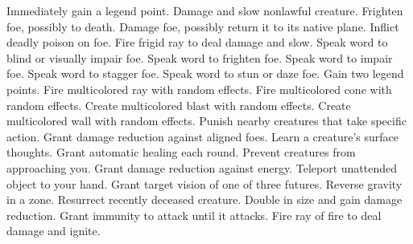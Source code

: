     {Immediately gain a legend point.}
    {Damage and slow nonlawful creature.}
    {Frighten foe, possibly to death.}
    {Damage foe, possibly return it to its native plane.}
    {Inflict deadly poison on foe.}
    {Fire frigid ray to deal damage and slow.}
    {Speak word to blind or visually impair foe.}
    {Speak word to frighten foe.}
    {Speak word to impair foe.}
    {Speak word to stagger foe.}
    {Speak word to stun or daze foe.}
    {Gain two legend points.}
    {Fire multicolored ray with random effects.}
    {Fire multicolored cone with random effects.}
    {Create multicolored blast with random effects.}
    {Create multicolored wall with random effects.}
    {Punish nearby creatures that take specific action.}
    {Grant damage reduction against aligned foes.}
    {Learn a creature's surface thoughts.}
    {Grant automatic healing each round.}
    {Prevent creatures from approaching you.}
    {Grant damage reduction against energy.}
    {Teleport unattended object to your hand.}
    {Grant target vision of one of three futures.}
    {Reverse gravity in a zone.}
    {Resurrect recently deceased creature.}
    {Double in size and gain damage reduction.}
    {Grant immunity to attack until it attacks.}
    {Fire ray of fire to deal damage and ignite.}
